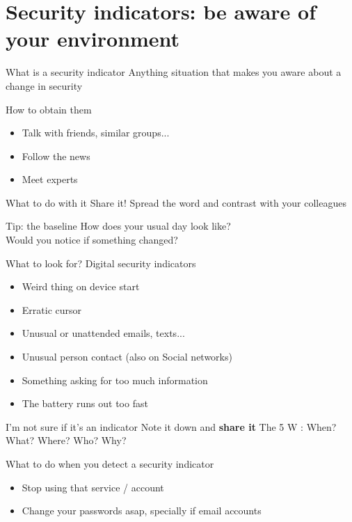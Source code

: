 \documentclass[11pt]{beamer}
\begin{document}
\section{Security indicators: be aware of your environment}
\begin{frame}{What is a security indicator}
Anything situation that makes you aware about a change in security
\end{frame}
\begin{frame}{How to obtain them}
\begin{itemize}
\item Talk with friends, similar groups...
\item Follow the news
\item Meet experts
\end{itemize}
\end{frame}
\begin{frame}{What to do with it}
Share it!  Spread the word and contrast with your colleagues
\end{frame}
\begin{frame}{Tip: the baseline}
How does your usual day look  like?\\
Would you notice if something changed?
\end{frame}
\begin{frame}{What to look for? Digital security indicators}
\begin{itemize}
\item Weird thing on device start
\item Erratic cursor
\item Unusual or unattended emails, texts...
\item Unusual person contact (also on Social networks)
\item Something asking for  too  much information
\item The battery runs out too fast
\end{itemize}
\end{frame}
\begin{frame}{I'm not sure if it's an indicator}
Note it down and \textbf{share it}
The 5 W : When? What? Where? Who? Why? 
\end{frame}
\begin{frame}{What to do when you detect a security indicator}
\begin{itemize}
\item Stop using that service / account
\item Change your passwords asap, specially if email accounts
\end{itemize}
\end{frame}
\end{document}
